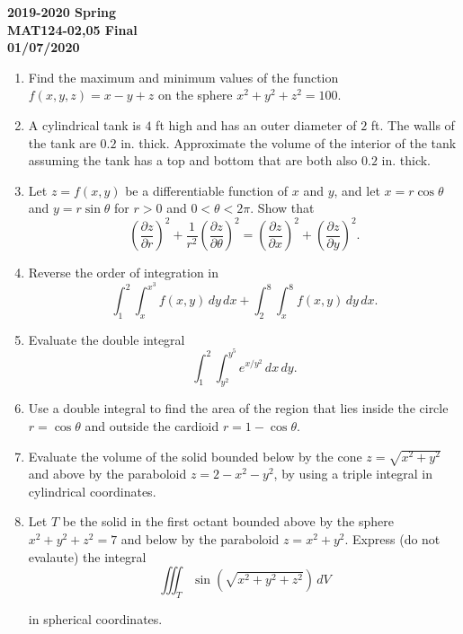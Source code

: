 \documentclass[a4paper, 12pt]{article}
\begin{document}
\pagestyle{empty}

\begin{center}
\textbf{2019-2020 Spring \\MAT124-02,05 Final\\01/07/2020}
\end{center}

\begin{enumerate}[leftmargin=*,label=\textbf{\arabic*.}]
\item Find the maximum and minimum values of the function $f(x,y,z)=x-y+z$ on the sphere $x^2+y^2+z^2=100$.

\item A cylindrical tank is $4$ ft high and has an outer diameter of $2$ ft. The walls of the tank are $0.2$ in. thick. Approximate the volume of the interior of the tank assuming the tank has a top and bottom that are both also $0.2$ in. thick.

\item Let $z=f(x,y)$ be a differentiable function of $x$ and $y$, and let $x=r\cos\theta$ and $y=r\sin\theta$ for $r>0$ and $0<\theta<2\pi$. Show that
\[\left(\frac{\partial z}{\partial r}\right)^2+\frac1{r^2}\left(\frac{\partial z}{\partial\theta}\right)^2=\left(\frac{\partial z}{\partial x}\right)^2+\left(\frac{\partial z}{\partial y}\right)^2.\]

\item Reverse the order of integration in
\[\displaystyle\int_1^2\int_x^{x^3}f(x,y)\,dy\,dx+\int_2^8\int_x^8f(x,y)\,dy\,dx.\]

\item Evaluate the double integral
\[\int_1^2\int_{y^2}^{y^5}{e}^{x/y^2}\,dx\,dy.\]

\item Use a double integral to find the area of the region that lies inside the circle $r=\cos\theta$ and outside the cardioid $r=1-\cos\theta$.

\item Evaluate the volume of the solid bounded below by the cone $z=\sqrt{x^2+y^2}$ and above by the paraboloid $z=2-x^2-y^2$, by using a triple integral in cylindrical coordinates.

\item Let $T$ be the solid in the first octant bounded above by the sphere $x^2+y^2+z^2=7$ and below by the paraboloid $z=x^2+y^2$. Express (do not evalaute) the integral
\[\iiint_T\sin\left(\sqrt{x^2+y^2+z^2}\right)\,dV\]

in spherical coordinates.
\end{enumerate}
\end{document}
